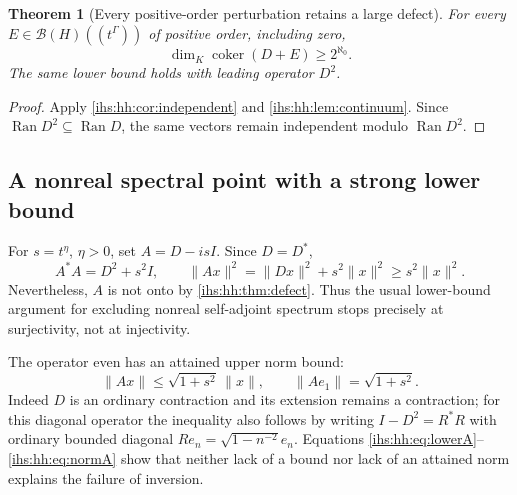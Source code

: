 \documentclass[11pt,a4paper]{article}
\numberwithin{equation}{section}
\newtheorem{theorem}{Theorem}[section]
\theoremstyle{definition}
\theoremstyle{remark}
\newcommand{\K}{K}
\newcommand{\B}{\mathcal B(H)}
\newcommand{\Ran}{\operatorname{Ran}}
\newcommand{\coker}{\operatorname{coker}}
\newcommand{\norm}[1]{\lVert#1\rVert}
\begin{document}
\begin{theorem}[Every positive-order perturbation retains a large defect]\label{ihs:hh:thm:continuum}
For every $E\in\B((t^\Gamma))$ of positive order, including zero,
\[
 \dim_\K\coker(D+E)\ge2^{\aleph_0}.
\]
The same lower bound holds with leading operator $D^2$.
\end{theorem}
\begin{proof}
Apply \cref{ihs:hh:cor:independent} and \cref{ihs:hh:lem:continuum}. Since
$\Ran D^2\subseteq\Ran D$, the same vectors remain independent modulo
$\Ran D^2$.
\end{proof}

\subsection{A nonreal spectral point with a strong lower bound}\label{ihs:hh:sec:lowerbound}
For $s=t^\eta$, $\eta>0$, set $A=D-isI$. Since $D=D^*$,
\begin{equation}\label{ihs:hh:eq:lowerA}
 A^*A=D^2+s^2I,\qquad
 \norm{Ax}^2=\norm{Dx}^2+s^2\norm{x}^2\ge s^2\norm{x}^2.
\end{equation}
Nevertheless, $A$ is not onto by \cref{ihs:hh:thm:defect}. Thus the usual
lower-bound argument for excluding nonreal self-adjoint spectrum stops
precisely at surjectivity, not at injectivity.

The operator even has an attained upper norm bound:
\begin{equation}\label{ihs:hh:eq:normA}
 \norm{Ax}\le\sqrt{1+s^2}\,\norm{x},\qquad
 \norm{Ae_1}=\sqrt{1+s^2}.
\end{equation}
Indeed $D$ is an ordinary contraction and its extension remains a
contraction; for this diagonal operator the inequality also follows by
writing $I-D^2=R^*R$ with ordinary bounded diagonal
$Re_n=\sqrt{1-n^{-2}}e_n$. Equations
\eqref{ihs:hh:eq:lowerA}--\eqref{ihs:hh:eq:normA} show that neither lack of
a bound nor lack of an attained norm explains the failure of inversion.
\end{document}

